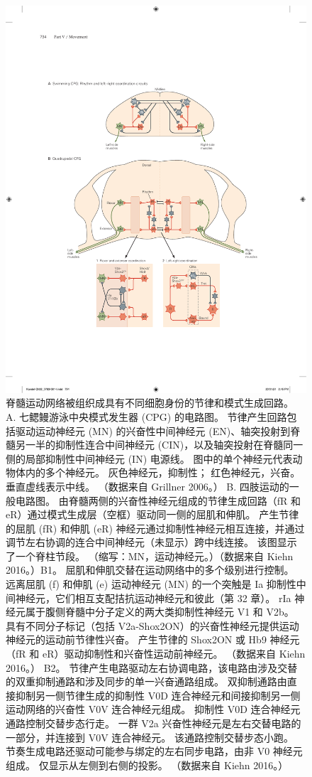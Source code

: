 \begin{figure}[htbp]
	\centering
	\includegraphics[width=0.8\linewidth]{chap33/fig_33_7}
	\caption{脊髓运动网络被组织成具有不同细胞身份的节律和模式生成回路。 A. 七鳃鳗游泳中央模式发生器 (CPG) 的电路图。 节律产生回路包括驱动运动神经元 (MN) 的兴奋性中间神经元 (EN)、轴突投射到脊髓另一半的抑制性连合中间神经元 (CIN)，以及轴突投射在脊髓同一侧的局部抑制性中间神经元 (IN) 电源线。 图中的单个神经元代表动物体内的多个神经元。 灰色神经元，抑制性； 红色神经元，兴奋。 垂直虚线表示中线。 （数据来自 Grillner 2006。） B. 四肢运动的一般电路图。 由脊髓两侧的兴奋性神经元组成的节律生成回路（fR 和 eR）通过模式生成层（空框）驱动同一侧的屈肌和伸肌。 产生节律的屈肌 (fR) 和伸肌 (eR) 神经元通过抑制性神经元相互连接，并通过调节左右协调的连合中间神经元（未显示）跨中线连接。 该图显示了一个脊柱节段。 （缩写：MN，运动神经元。）（数据来自 Kiehn 2016。）B1。 屈肌和伸肌交替在运动网络中的多个级别进行控制。 远离屈肌 (f) 和伸肌 (e) 运动神经元 (MN) 的一个突触是 Ia 抑制性中间神经元，它们相互支配拮抗运动神经元和彼此（第 32 章）。 rIa 神经元属于腹侧脊髓中分子定义的两大类抑制性神经元 V1 和 V2b。 具有不同分子标记（包括 V2a-Shox2ON）的兴奋性神经元提供运动神经元的运动前节律性兴奋。 产生节律的 Shox2ON 或 Hb9 神经元（fR 和 eR）驱动抑制性和兴奋性运动前神经元。 （数据来自 Kiehn 2016。） B2。 节律产生电路驱动左右协调电路，该电路由涉及交替的双重抑制通路和涉及同步的单一兴奋通路组成。 双抑制通路由直接抑制另一侧节律生成的抑制性 V0D 连合神经元和间接抑制另一侧运动网络的兴奋性 V0V 连合神经元组成。 抑制性 V0D 连合神经元通路控制交替步态行走。 一群 V2a 兴奋性神经元是左右交替电路的一部分，并连接到 V0V 连合神经元。 该通路控制交替步态小跑。 节奏生成电路还驱动可能参与绑定的左右同步电路，由非 V0 神经元组成。 仅显示从左侧到右侧的投影。 （数据来自 Kiehn 2016。）}
	\label{fig:33_7}
\end{figure}

